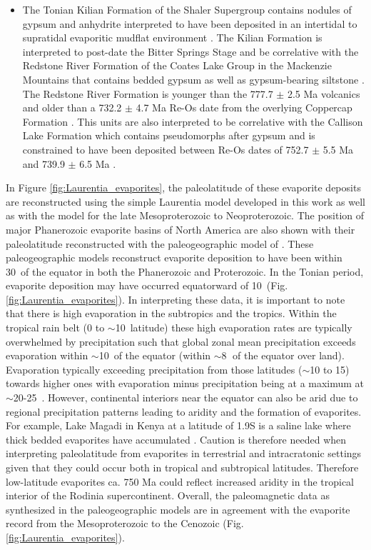 \documentclass[twocolumn, switch]{article} %
\begin{document}
\begin{itemize}
\item The Tonian Kilian Formation of the Shaler Supergroup contains nodules of gypsum and anhydrite interpreted to have been deposited in an intertidal to supratidal evaporitic mudflat environment \citep{Prince2014a}. The Kilian Formation is interpreted to post-date the Bitter Springs Stage and be correlative with the Redstone River Formation of the Coates Lake Group in the Mackenzie Mountains that contains bedded gypsum as well as gypsum-bearing siltstone \citep{Jefferson1989a, Jones2010a}. The Redstone River Formation is younger than the 777.7 $\pm$ 2.5 Ma volcanics and older than a 732.2 $\pm$ 4.7 Ma Re-Os date from the overlying Coppercap Formation \citep{Rooney2014a}. This units are also interpreted to be correlative with the Callison Lake Formation which contains pseudomorphs after gypsum and is constrained to have been deposited between Re-Os dates of 752.7 $\pm$ 5.5 Ma and 739.9 $\pm$ 6.5 Ma \citep{Strauss2015a}.
\end{itemize}

In Figure \ref{fig:Laurentia_evaporites}, the paleolatitude of these evaporite deposits are reconstructed using the simple Laurentia model developed in this work as well as with the \cite{Li2013a} model for the late Mesoproterozoic to Neoproterozoic. The position of major Phanerozoic evaporite basins of North America are also shown with their paleolatitude reconstructed with the paleogeographic model of \cite{Torsvik2017a}. These paleogeographic models reconstruct evaporite deposition to have been within 30\textdegree\ of the equator in both the Phanerozoic and Proterozoic. In the Tonian period, evaporite deposition may have occurred equatorward of 10\textdegree\ (Fig. \ref{fig:Laurentia_evaporites}). In interpreting these data, it is important to note that there is high evaporation in the subtropics and the tropics. Within the tropical rain belt (0 to $\sim$10\textdegree\ latitude) these high evaporation rates are typically overwhelmed by precipitation such that global zonal mean precipitation exceeds evaporation within $\sim$10\textdegree\ of the equator (within $\sim$8\textdegree$\;$ of the equator over land). Evaporation typically exceeding precipitation from those latitudes ($\sim$10 to 15\textdegree) towards higher ones with evaporation minus precipitation being at a maximum at $\sim$20-25\textdegree\ \citep{Park2021a}. However, continental interiors near the equator can also be arid due to regional precipitation patterns leading to aridity and the formation of evaporites. For example, Lake Magadi in Kenya at a latitude of 1.9\textdegree S is a saline lake where thick bedded evaporites have accumulated \citep{Eugster1980a}. Caution is therefore needed when interpreting paleolatitude from evaporites in terrestrial and intracratonic settings given that they could occur both in tropical and subtropical latitudes. Therefore low-latitude evaporites ca. 750 Ma could reflect increased aridity in the tropical interior of the Rodinia supercontinent. Overall, the paleomagnetic data as synthesized in the paleogeographic models are in agreement with the evaporite record from the Mesoproterozoic to the Cenozoic (Fig. \ref{fig:Laurentia_evaporites}).
\end{document}
